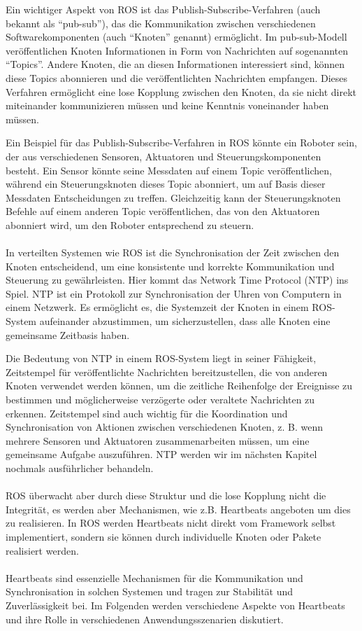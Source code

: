 \documentclass[../vs-script-first-v01.tex]{subfiles}
\begin{document}
Ein wichtiger Aspekt von ROS ist das Publish-Subscribe-Verfahren (auch bekannt als \enquote{pub-sub}), das die Kommunikation zwischen verschiedenen Softwarekomponenten (auch \enquote{Knoten} genannt) ermöglicht. Im pub-sub-Modell veröffentlichen Knoten Informationen in Form von Nachrichten auf sogenannten \enquote{Topics}. Andere Knoten, die an diesen Informationen interessiert sind, können diese Topics abonnieren und die veröffentlichten Nachrichten empfangen. Dieses Verfahren ermöglicht eine lose Kopplung zwischen den Knoten, da sie nicht direkt miteinander kommunizieren müssen und keine Kenntnis voneinander haben müssen.

Ein Beispiel für das Publish-Subscribe-Verfahren in ROS könnte ein Roboter sein, der aus verschiedenen Sensoren, Aktuatoren und Steuerungskomponenten besteht. Ein Sensor könnte seine Messdaten auf einem Topic veröffentlichen, während ein Steuerungsknoten dieses Topic abonniert, um auf Basis dieser Messdaten Entscheidungen zu treffen. Gleichzeitig kann der Steuerungsknoten Befehle auf einem anderen Topic veröffentlichen, das von den Aktuatoren abonniert wird, um den Roboter entsprechend zu steuern.
\\\\
In verteilten Systemen wie ROS ist die Synchronisation der Zeit zwischen den Knoten entscheidend, um eine konsistente und korrekte Kommunikation und Steuerung zu gewährleisten. Hier kommt das Network Time Protocol (NTP) ins Spiel. NTP ist ein Protokoll zur Synchronisation der Uhren von Computern in einem Netzwerk. Es ermöglicht es, die Systemzeit der Knoten in einem ROS-System aufeinander abzustimmen, um sicherzustellen, dass alle Knoten eine gemeinsame Zeitbasis haben.

Die Bedeutung von NTP in einem ROS-System liegt in seiner Fähigkeit, Zeitstempel für veröffentlichte Nachrichten bereitzustellen, die von anderen Knoten verwendet werden können, um die zeitliche Reihenfolge der Ereignisse zu bestimmen und möglicherweise verzögerte oder veraltete Nachrichten zu erkennen. Zeitstempel sind auch wichtig für die Koordination und Synchronisation von Aktionen zwischen verschiedenen Knoten, z. B. wenn mehrere Sensoren und Aktuatoren zusammenarbeiten müssen, um eine gemeinsame Aufgabe auszuführen. NTP werden wir im nächsten Kapitel nochmals ausführlicher behandeln. 
\\\\
ROS überwacht aber durch diese Struktur und die lose Kopplung nicht die Integrität, es werden aber Mechanismen, wie z.B. Heartbeats angeboten um dies zu realisieren.  In ROS werden Heartbeats nicht direkt vom Framework selbst implementiert, sondern sie können durch individuelle Knoten oder Pakete realisiert werden.
\\\\
Heartbeats sind essenzielle Mechanismen für die Kommunikation und Synchronisation in solchen Systemen und tragen zur Stabilität und Zuverlässigkeit bei. Im Folgenden werden verschiedene Aspekte von Heartbeats und ihre Rolle in verschiedenen Anwendungsszenarien diskutiert. 
\end{document}
